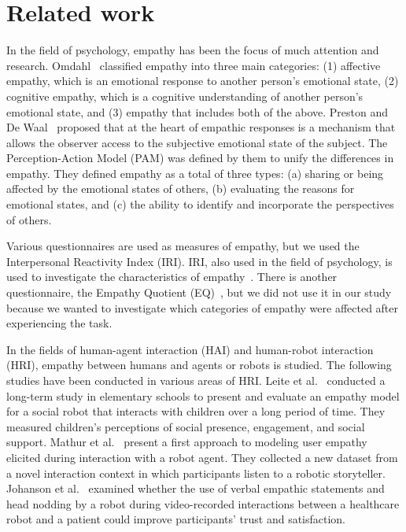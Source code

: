 \documentclass[runningheads]{llncs}
\begin{document}
\section{Related work}
In the field of psychology, empathy has been the focus of much attention and research. 
Omdahl~\cite{Omdahl95} classified empathy into three main categories: (1) affective empathy, which is an emotional response to another person's emotional state, (2) cognitive empathy, which is a cognitive understanding of another person's emotional state, and (3) empathy that includes both of the above.
Preston and De Waal~\cite{Preston02} proposed that at the heart of empathic responses is a mechanism that allows the observer access to the subjective emotional state of the subject. 
The Perception-Action Model (PAM) was defined by them to unify the differences in empathy. 
They defined empathy as a total of three types: (a) sharing or being affected by the emotional states of others, (b) evaluating the reasons for emotional states, and (c) the ability to identify and incorporate the perspectives of others. 

Various questionnaires are used as measures of empathy, but we used the Interpersonal Reactivity Index (IRI). 
IRI, also used in the field of psychology, is used to investigate the characteristics of empathy~\cite{Davis80}. 
There is another questionnaire, the Empathy Quotient (EQ)~\cite{Cohen04}, but we did not use it in our study because we wanted to investigate which categories of empathy were affected after experiencing the task.

In the fields of human-agent interaction (HAI) and human-robot interaction (HRI), empathy between humans and agents or robots is studied. 
The following studies have been conducted in various areas of HRI. 
Leite et al.~\cite{Leite14} conducted a long-term study in elementary schools to present and evaluate an empathy model for a social robot that interacts with children over a long period of time. 
They measured children's perceptions of social presence, engagement, and social support. Mathur et al.~\cite{Mathur21} present a first approach to modeling user empathy elicited during interaction with a robot agent. 
They collected a new dataset from a novel interaction context in which participants listen to a robotic storyteller. 
Johanson et al.~\cite{Johanson23} examined whether the use of verbal empathic statements and head nodding by a robot during video-recorded interactions between a healthcare robot and a patient could improve participants' trust and satisfaction.
\end{document}
